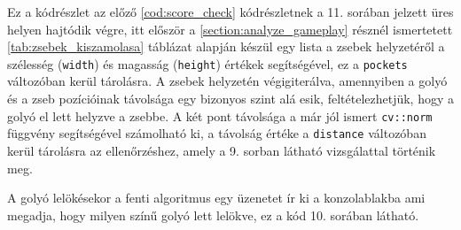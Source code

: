 \par Ez a kódrészlet az előző \ref{cod:score_check} kódrészletnek a 11. sorában jelzett üres helyen hajtódik végre, itt először a \ref{section:analyze_gameplay} résznél ismertetett \ref{tab:zsebek_kiszamolasa} táblázat alapján készül egy lista a zsebek helyzetéről a szélesség (\lstinline{width}) és magasság (\lstinline{height}) értékek segítségével, ez a \lstinline{pockets} változóban kerül tárolásra. A zsebek helyzetén végigiterálva, amennyiben a golyó és a zseb pozícióinak távolsága egy bizonyos szint alá esik, feltételezhetjük, hogy a golyó el lett helyzve a zsebbe. A két pont távolsága a már jól ismert \lstinline{cv::norm} függvény\cite{opencv_docs} segítségével számolható ki, a távolság értéke a \lstinline{distance} változóban kerül tárolásra az ellenőrzéshez, amely a 9. sorban látható vizsgálattal történik meg.
\par A golyó lelökésekor a fenti algoritmus egy üzenetet ír ki a konzolablakba ami megadja, hogy milyen színű golyó lett lelökve, ez a kód 10. sorában látható.